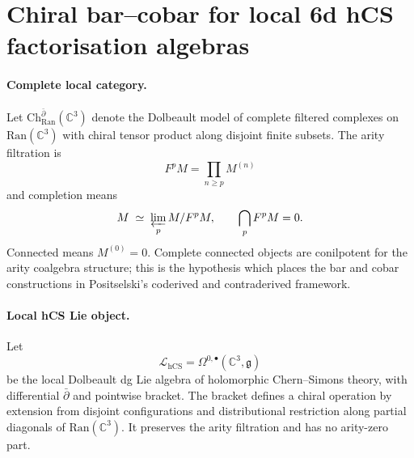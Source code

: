 
\providecommand{\Obs}{\mathrm{Obs}}
\providecommand{\hCS}{\mathrm{hCS}}
\providecommand{\CE}{\mathrm{CE}}
\providecommand{\HH}{\mathrm{HH}}
\providecommand{\RHom}{\mathrm{RHom}}
\providecommand{\Ch}{\mathrm{Ch}}
\providecommand{\Dolb}{\mathrm{Dolb}}
\providecommand{\chir}{\mathrm{chir}}
\providecommand{\dbar}{\bar\partial}
\providecommand{\kch}{\kappa_{\mathrm{ch}}}
\providecommand{\kcat}{\kappa_{\mathrm{cat}}}
\providecommand{\kBKM}{\kappa_{\mathrm{BKM}}}
\providecommand{\kfiber}{\kappa_{\mathrm{fiber}}}
\providecommand{\Ran}{\mathrm{Ran}}
\providecommand{\Sym}{\mathrm{Sym}}
\providecommand{\Hom}{\mathrm{Hom}}
\providecommand{\Rep}{\mathrm{Rep}}
\providecommand{\CoHA}{\mathrm{CoHA}}
\providecommand{\C}{\mathbb{C}}
\providecommand{\cO}{\mathcal{O}}
\providecommand{\cE}{\mathcal{E}}
\providecommand{\cF}{\mathcal{F}}
\providecommand{\cC}{\mathcal{C}}
\providecommand{\cL}{\mathcal{L}}
\providecommand{\g}{\mathfrak{g}}
\providecommand{\fgl}{\mathfrak{gl}}
\providecommand{\Lie}{\mathrm{Lie}}
\providecommand{\coLie}{\mathrm{coLie}}
\providecommand{\coCE}{\mathrm{coCE}}
\providecommand{\Bar}{\mathrm{B}}
\providecommand{\Cob}{\Omega}
\providecommand{\Etwo}{E_2}
\providecommand{\Ethree}{E_3}
\providecommand{\Eone}{E_1}
\providecommand{\MF}{\mathrm{MF}}

\section*{Chiral bar--cobar for local 6d hCS factorisation algebras}

\paragraph{Complete local category.}
Let $\Ch_{\Ran}^{\dbar}(\C^3)$ denote the Dolbeault model of complete
filtered complexes on $\Ran(\C^3)$ with chiral tensor product along
disjoint finite subsets.  The arity filtration is
\[
  F^p M = \prod_{n \geq p} M^{(n)}
\]
and completion means
\[
  M \;\simeq\; \varprojlim_p M/F^pM,
  \qquad
  \bigcap_p F^pM = 0 .
\]
Connected means $M^{(0)}=0$.  Complete connected objects are
conilpotent for the arity coalgebra structure; this is the hypothesis
which places the bar and cobar constructions in Positselski's
coderived and contraderived framework.

\paragraph{Local hCS Lie object.}
Let
\[
  \cL_{\hCS}=\Omega^{0,\bullet}(\C^3,\g)
\]
be the local Dolbeault dg Lie algebra of holomorphic Chern--Simons
theory, with differential $\dbar$ and pointwise bracket.  The bracket
defines a chiral operation by extension from disjoint configurations
and distributional restriction along partial diagonals of $\Ran(\C^3)$.
It preserves the arity filtration and has no arity-zero part.


